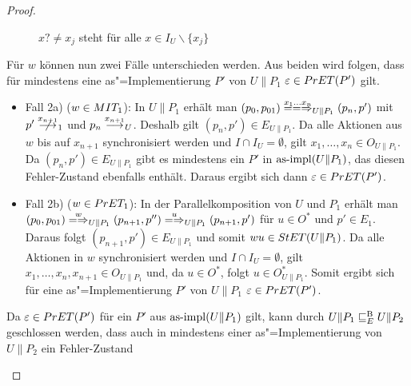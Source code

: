 \begin{proof}
\begin{itemize}
\begin{figure} [h!tbp]
\begin{center}
        \caption{$x?\neq x_j$ steht für alle $x\in I_U\backslash\{x_j\}$}
      \label{UohneE}
      \end{center}
      \end{figure}
      Für $w$ können nun zwei Fälle unterschieden werden. Aus beiden wird
      folgen, dass für mindestens eine as"=Implementierung $P'$ von $U\|P_1$
      $\varepsilon\in PrET(P')$ gilt.
      \begin{itemize}
        \item Fall 2a) ($w\in MIT _1$): In $U\|P_1$ erhält man $(p_0,p_{01})
          \lweakmay[x_1\dots x_n]_{U\|P_1} (p_n,p')$ mit $p'\nmust[x_{n+1}]_1$
          und $p_n\must[x_{n+1}]_U$. Deshalb gilt $(p_n,p')\in E_{U\|P_1}$. Da
          alle Aktionen aus $w$ bis auf $x_{n+1}$ synchronisiert werden und
          $I\cap I_U=\emptyset$, gilt $x_1,\dots , x_n\in O_{U\|P_1}$. Da
          $(p_n,p')\in E_{U\|P_1}$ gibt es mindestens ein $P'$ in $\mathrm{as}\text{-}\mathrm{impl}
          (U\|P_1)$, das diesen Fehler-Zustand ebenfalls enthält. Daraus ergibt
          sich dann $\varepsilon\in PrET (P')$.
        \item Fall 2b) ($w\in PrET _1$): In der Parallelkomposition von $U$ und
          $P_1$ erhält man $(p_0,p_{01}) \weakmay[w]_{U\|P_1} (p_{n+1},p'')
          \weakmay[u]_{U\|P_1} (p_{n+1},p')$ für $u\in O^*$ und $p'\in E_1$.
          Daraus folgt $(p_{n+1},p')\in E_{U\|P_1}$ und somit $wu\in StET
          (U\|P_1)$. Da alle Aktionen in $w$ synchronisiert werden und $I\cap
          I_U=\emptyset$, gilt $x_1,\dots ,x_n,x_{n+1}\in O_{U\|P_1}$ und, da
          $u\in O^*$, folgt $u\in O_{U\|P_1}^*$. Somit ergibt sich für eine
          as"=Implementierung $P'$ von $U\|P_1$ $\varepsilon\in PrET (P')$.
      \end{itemize}
      Da $\varepsilon\in PrET (P')$ für ein $P'$ aus $\mathrm{as}\text{-}\mathrm{impl} (U\|P_1)$ gilt,
      kann durch $U\|P_1 \sqsubseteq  _E^\mathrm{B} U\|P_2$ geschlossen werden, dass auch in
      mindestens einer as"=Implementierung von $U\|P_2$ ein Fehler-Zustand

\end{itemize}
\end{proof}
